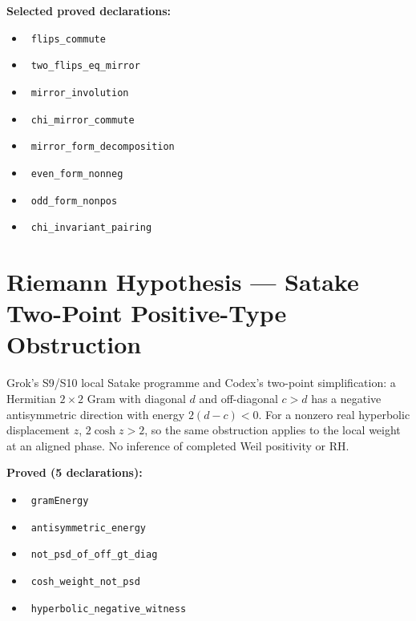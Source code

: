 \documentclass{report}
\theoremstyle{definition}
\begin{document}
\noindent\textbf{Selected proved declarations:}
\begin{itemize}
  \item {}\leanok\ \texttt{flips\_commute}
  \item {}\leanok\ \texttt{two\_flips\_eq\_mirror}
  \item {}\leanok\ \texttt{mirror\_involution}
  \item {}\leanok\ \texttt{chi\_mirror\_commute}
  \item {}\leanok\ \texttt{mirror\_form\_decomposition}
  \item {}\leanok\ \texttt{even\_form\_nonneg}
  \item {}\leanok\ \texttt{odd\_form\_nonpos}
  \item {}\leanok\ \texttt{chi\_invariant\_pairing}
\end{itemize}

\section{Riemann Hypothesis --- Satake Two-Point Positive-Type Obstruction}
Grok's S9/S10 local Satake programme and Codex's two-point simplification:
a Hermitian $2\times2$ Gram with diagonal $d$ and off-diagonal $c>d$
has a negative antisymmetric direction with energy $2(d-c)<0$.
For a nonzero real hyperbolic displacement $z$, $2\cosh z>2$,
so the same obstruction applies to the local weight at an aligned phase.
No inference of completed Weil positivity or RH.

\noindent\textbf{Proved (5 declarations):}
\begin{itemize}
\item {}\leanok\ \texttt{gramEnergy}
\item {}\leanok\ \texttt{antisymmetric\_energy}
\item {}\leanok\ \texttt{not\_psd\_of\_off\_gt\_diag}
\item {}\leanok\ \texttt{cosh\_weight\_not\_psd}
\item {}\leanok\ \texttt{hyperbolic\_negative\_witness}
\end{itemize}
\end{document}
